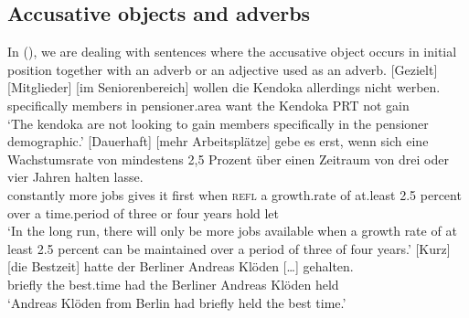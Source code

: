 



\subsection{Accusative objects and adverbs}

In (), we are dealing with sentences where the accusative object occurs in initial position together with an adverb 
or an adjective used as an adverb.
\eal
\label{bsp-mehrfach-vf-adv-acc}
\ex 
\gll {}[Gezielt] [Mitglieder] [im Seniorenbereich] wollen die Kendoka allerdings nicht werben.\label{bsp-gezielt-mitglieder}\footnotemark\\
       \spacebr{}specifically \spacebr{}members \spacebr{}in pensioner.area want the Kendoka PRT not gain\\
\glt `The kendoka are not looking to gain members specifically in the pensioner demographic.'
\ex
\gll {}[Dauerhaft] [mehr Arbeitsplätze] gebe es erst, wenn sich eine Wachstumsrate von  mindestens 2,5 Prozent über einen Zeitraum von drei oder vier Jahren halten lasse.\footnotemark\\ 
       \spacebr{}constantly \spacebr{}more jobs gives it first when \textsc{refl} a growth.rate of  at.least 2.5 percent over a time.period of three or four years hold let\\
\label{bsp-dauerhaft-mehr-arbeitsplaetze}
\glt `In the long run, there will only be more jobs available when a growth rate of at least 2.5 percent 
can be maintained over a period of three of four years.'	
\ex 
\gll {}[Kurz] [die Bestzeit] hatte der Berliner Andreas Klöden [\ldots] gehalten.\footnotemark\\
	 \spacebr{}briefly \spacebr{}the best.time had the Berliner Andreas Klöden {} held\\
\label{bsp-kurz-die-bestzeit}     
\glt `Andreas Klöden from Berlin had briefly held the best time.'
\zl



